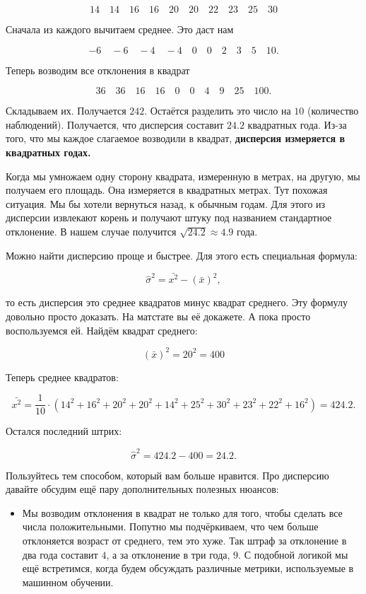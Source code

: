 \documentclass[12pt, a4paper, oneside]{article}
\theoremstyle{plain} %
\theoremstyle{definition}
\newcommand{\indef}[1]{\textbf{ \color{green} #1}}
\begin{document}
\begin{solution}
\begin{enumerate}
	\[
	14 \quad 14  \quad 16  \quad 16  \quad 20  \quad 20  \quad 22  \quad 23  \quad 25  \quad 30
	\]
	
	Сначала из каждого вычитаем среднее. Это даст нам
	
	\[
	-6 \quad -6  \quad -4  \quad -4  \quad 0  \quad 0 \quad 2  \quad 3  \quad 5  \quad 10.
	\]
	
	Теперь возводим все отклонения в квадрат
	
	\[
	36 \quad 36  \quad 16  \quad 16 \quad 0  \quad 0 \quad 4  \quad 9 \quad 25  \quad 100.
	\]
	
	Складываем их.  Получается $242$. Остаётся разделить это число на  $10$ (количество наблюдений). Получается, что дисперсия составит $24.2$ квадратных года.  Из-за того, что мы каждое слагаемое возводили в квадрат, \indef{дисперсия измеряется в квадратных годах.}
	
	Когда мы умножаем одну сторону квадрата, измеренную в метрах, на другую, мы получаем его площадь. Она измеряется в квадратных метрах. Тут похожая ситуация. Мы бы хотели вернуться назад, к обычным годам. Для этого из дисперсии извлекают корень и получают штуку под названием стандартное отклонение. В нашем случае получится $\sqrt{24.2} \approx 4.9$ года. 
	
	
	Можно найти дисперсию проще и быстрее. Для этого есть специальная формула: 

	$$
	\hat \sigma^2 = \bar{x^2} - (\bar x)^2,
	$$
	
	то есть дисперсия это среднее квадратов минус квадрат среднего. Эту формулу довольно просто доказать. На матстате вы её докажете. А пока просто воспользуемся ей. Найдём квадрат среднего:
	
	$$
	(\bar x)^2 = 20^2 = 400
	$$
	
	Теперь среднее квадратов: 
	
	$$
	\bar{x^2} = \frac{1}{10} \cdot (14^2 + 16^2 + 20^2 + 20^2 + 14^2 + 25^2 + 30^2 + 23^2 + 22^2 + 16^2) = 424.2.
	$$
	
	Остался последний штрих: 
	
	$$
	\hat \sigma^2 = 424.2 - 400 = 24.2.
	$$
	
	Пользуйтесь тем способом, который вам больше нравится. Про дисперсию давайте обсудим ещё пару дополнительных полезных нюансов: 
	
	\begin{itemize}
		\item  Мы возводим отклонения в квадрат не только для того, чтобы сделать все числа положительными. Попутно мы подчёркиваем, что чем больше отклоняется возраст от среднего, тем это хуже. Так штраф за отклонение в два года составит $4$, а за отклонение в три года, $9$.  С подобной логикой мы ещё встретимся, когда будем обсуждать различные метрики, используемые в машинном обучении. 
		

\end{itemize}
\end{enumerate}
\end{solution}
\end{document}
